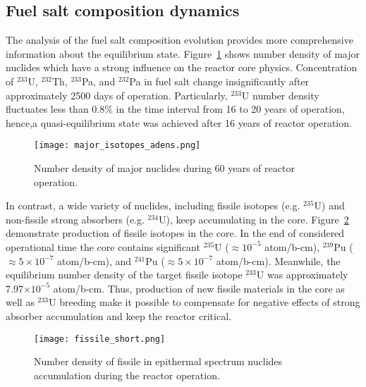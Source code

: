 \subsection{Fuel salt composition dynamics}
The analysis of the fuel salt composition evolution provides more comprehensive 
information about the equilibrium state. Figure~\ref{fig:adens_eq} shows number 
density of major nuclides which have a strong influence on the reactor core 
physics. Concentration of $^{233}$U, $^{232}$Th, $^{233}$Pa, and $^{232}$Pa in 
fuel salt change insignificantly after approximately 2500 days of operation. 
Particularly, $^{233}$U number density fluctuates less than 0.8\% in the time 
interval from 16 to 20 years of operation, hence,a quasi-equilibrium state was 
achieved after 16 years of reactor operation.
\begin{figure}[ht!] %
  \centering
  \texttt{[image: major\_isotopes\_adens.png]}
  \caption{Number density of major nuclides during 60 years of reactor 
operation.}
  \label{fig:adens_eq}
\end{figure}
In contrast, a wide variety of nuclides, including fissile isotopes (e.g. 
$^{235}$U) and non-fissile strong absorbers (e.g. $^{234}$U), keep accumulating 
in the core. Figure~\ref{fig:fissile_short} demonstrate production of fissile 
isotopes in the core. In the end of considered operational time the core 
contains significant $^{235}$U ($\approx10^{-5}$ atom/b-cm), $^{239}$Pu 
($\approx5\times10^{-7}$ atom/b-cm), and $^{241}$Pu ($\approx 5\times10^{-7}$ 
atom/b-cm). Meanwhile, the equilibrium number density of the target fissile 
isotope $^{233}$U was approximately 7.97$\times10^{-5}$ atom/b-cm. Thus, 
production of new fissile materials in the core as well as $^{233}$U breeding 
make it possible to compensate for negative effects of strong absorber 
accumulation and keep the reactor critical.
\begin{figure}[htp!] %
  \centering
  \texttt{[image: fissile\_short.png]}
  \caption{Number density of fissile in epithermal spectrum nuclides 
accumulation during the reactor operation.}
  \label{fig:fissile_short}
\end{figure}

